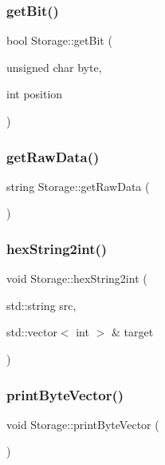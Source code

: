 \subsubsection{get\+Bit()}
{\footnotesize\ttfamily bool Storage\+::get\+Bit (\begin{DoxyParamCaption}\item[{unsigned char}]{byte,  }\item[{int}]{position }\end{DoxyParamCaption})\hspace{0.3cm}{\ttfamily [protected]}}

\mbox{\label{class_storage_af3ccaf7489cfef2e9cb610989dcd4817}} 
\subsubsection{get\+Raw\+Data()}
{\footnotesize\ttfamily string Storage\+::get\+Raw\+Data (\begin{DoxyParamCaption}{ }\end{DoxyParamCaption})}

\mbox{\label{class_storage_ae18375a7a591503e52e385db8e0233a5}} 
\subsubsection{hex\+String2int()}
{\footnotesize\ttfamily void Storage\+::hex\+String2int (\begin{DoxyParamCaption}\item[{std\+::string}]{src,  }\item[{std\+::vector$<$ int $>$ \&}]{target }\end{DoxyParamCaption})}

\mbox{\label{class_storage_a9e306e4e378e00197d5d024b0421805b}} 
\subsubsection{print\+Byte\+Vector()}
{\footnotesize\ttfamily void Storage\+::print\+Byte\+Vector (\begin{DoxyParamCaption}{ }\end{DoxyParamCaption})}

